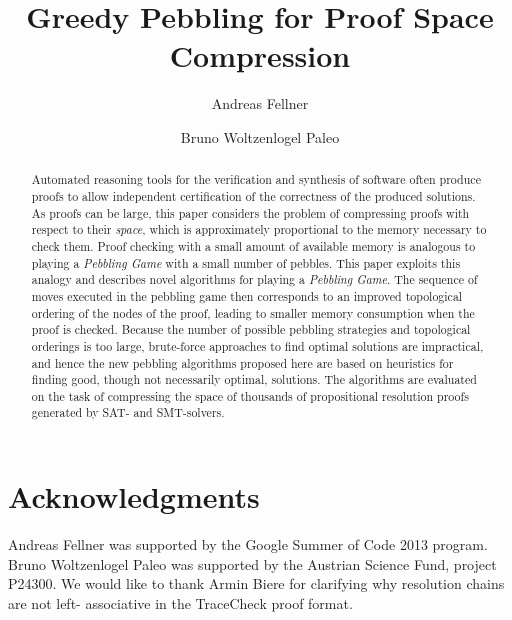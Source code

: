 \documentclass[twocolumn]{svjour3}
\title{Greedy Pebbling for Proof Space Compression}
\author{
  Andreas Fellner 
  \and 
  Bruno Woltzenlogel Paleo 
}
\institute{
  Andreas Fellner \\
	\email{afellner@forsyte.tuwien.ac.at} \\
	Bruno Woltzenlogel Paleo  \\
	\email{bruno@logic.at} \\ \at
  Theory and Logic Group\\
	Institute for Computer Languages \\
  Vienna University of Technology
}
\begin{document}
\maketitle

\begin{abstract} %
Automated reasoning tools for the verification and synthesis of software 
often produce proofs to allow independent certification of the correctness 
of the produced solutions. 
As proofs can be large, this paper 
considers the problem of compressing proofs with respect to their 
\emph{space}, which is approximately proportional to the 
memory necessary to check them. 
Proof checking with a small 
amount of available memory is analogous to playing a \emph{Pebbling Game} 
with a small number of pebbles. 
This paper exploits this 
analogy and describes novel algorithms for playing a \emph{Pebbling Game}. 
The sequence of moves executed in the pebbling game then 
corresponds to an improved topological ordering of the nodes of 
the proof, leading to smaller memory consumption when the proof 
is checked. Because the number of possible pebbling strategies and 
topological orderings is too large, brute-force approaches to find 
optimal solutions are impractical, and hence the new pebbling algorithms 
proposed here are based on heuristics for finding good, though 
not necessarily optimal, solutions. The algorithms are evaluated on the 
task of compressing the space of thousands of propositional resolution 
proofs generated by SAT- and SMT-solvers. 


\end{abstract}


\section{Acknowledgments}

Andreas Fellner was supported by the Google Summer of Code 2013 program.
Bruno Woltzenlogel Paleo was supported by the Austrian Science Fund, project P24300.
We would like to thank Armin Biere for clarifying why resolution chains are not left- associative in the TraceCheck proof format.

\end{document}

